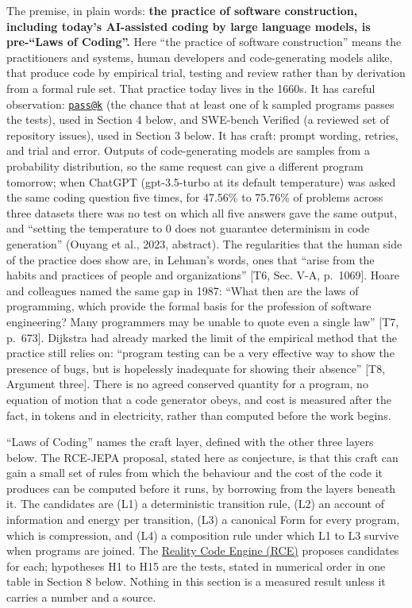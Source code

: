 \documentclass[10pt,letterpaper]{article}
\begin{document}
The premise, in plain words: \textbf{the practice of software
construction, including today's AI-assisted coding by large language
models, is pre-``Laws of Coding''.} Here ``the practice of software
construction'' means the practitioners and systems, human developers and
code-generating models alike, that produce code by empirical trial,
testing and review rather than by derivation from a formal rule set.
That practice today lives in the 1660s. It has careful observation:
\href{mailto:pass@k}{\nolinkurl{pass@k}} (the chance that at least one
of k sampled programs passes the tests), used in Section 4 below, and
SWE-bench Verified (a reviewed set of repository issues), used in
Section 3 below. It has craft: prompt wording, retries, and trial and
error. Outputs of code-generating models are samples from a probability
distribution, so the same request can give a different program tomorrow;
when ChatGPT (gpt-3.5-turbo at its default temperature) was asked the
same coding question five times, for 47.56\% to 75.76\% of problems
across three datasets there was no test on which all five answers gave
the same output, and ``setting the temperature to 0 does not guarantee
determinism in code generation'' (Ouyang et al., 2023, abstract). The
regularities that the human side of the practice does show are, in
Lehman's words, ones that ``arise from the habits and practices of
people and organizations'' {[}T6, Sec. V-A, p.~1069{]}. Hoare and
colleagues named the same gap in 1987: ``What then are the laws of
programming, which provide the formal basis for the profession of
software engineering? Many programmers may be unable to quote even a
single law'' {[}T7, p.~673{]}. Dijkstra had already marked the limit of
the empirical method that the practice still relies on: ``program
testing can be a very effective way to show the presence of bugs, but is
hopelessly inadequate for showing their absence'' {[}T8, Argument
three{]}. There is no agreed conserved quantity for a program, no
equation of motion that a code generator obeys, and cost is measured
after the fact, in tokens and in electricity, rather than computed
before the work begins.

``Laws of Coding'' names the craft layer, defined with the other three
layers below. The RCE-JEPA proposal, stated here as conjecture, is that
this craft can gain a small set of rules from which the behaviour and
the cost of the code it produces can be computed before it runs, by
borrowing from the layers beneath it. The candidates are (L1) a
deterministic transition rule, (L2) an account of information and energy
per transition, (L3) a canonical Form for every program, which is
compression, and (L4) a composition rule under which L1 to L3 survive
when programs are joined. The
\href{https://research.openie.dev/about/rce/}{Reality Code Engine (RCE)}
proposes candidates for each; hypotheses H1 to H15 are the tests, stated
in numerical order in one table in Section 8 below. Nothing in this
section is a measured result unless it carries a number and a source.
\end{document}
